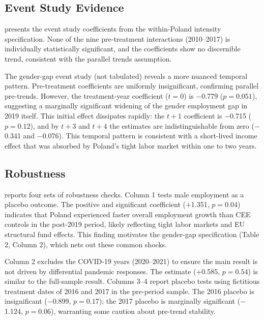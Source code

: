 \documentclass[12pt]{article}
\begin{document}


\subsection{Event Study Evidence}

 presents the event study coefficients from the within-Poland intensity specification. None of the nine pre-treatment interactions (2010--2017) is individually statistically significant, and the coefficients show no discernible trend, consistent with the parallel trends assumption.

The gender-gap event study (not tabulated) reveals a more nuanced temporal pattern. Pre-treatment coefficients are uniformly insignificant, confirming parallel pre-trends. However, the treatment-year coefficient ($t = 0$) is $-$0.779 ($p = 0.051$), suggesting a marginally significant widening of the gender employment gap in 2019 itself. This initial effect dissipates rapidly: the $t + 1$ coefficient is $-$0.715 ($p = 0.12$), and by $t + 3$ and $t + 4$ the estimates are indistinguishable from zero ($-$0.341 and $-$0.076). This temporal pattern is consistent with a short-lived income effect that was absorbed by Poland's tight labor market within one to two years.



\subsection{Robustness}

 reports four sets of robustness checks. Column 1 tests male employment as a placebo outcome. The positive and significant coefficient (+1.351, $p = 0.04$) indicates that Poland experienced faster overall employment growth than CEE controls in the post-2019 period, likely reflecting tight labor markets and EU structural fund effects. This finding motivates the gender-gap specification (Table 2, Column 2), which nets out these common shocks.

Column 2 excludes the COVID-19 years (2020--2021) to ensure the main result is not driven by differential pandemic responses. The estimate (+0.585, $p = 0.54$) is similar to the full-sample result. Columns 3--4 report placebo tests using fictitious treatment dates of 2016 and 2017 in the pre-period sample. The 2016 placebo is insignificant ($-$0.899, $p = 0.17$); the 2017 placebo is marginally significant ($-$1.124, $p = 0.06$), warranting some caution about pre-trend stability.
\end{document}
